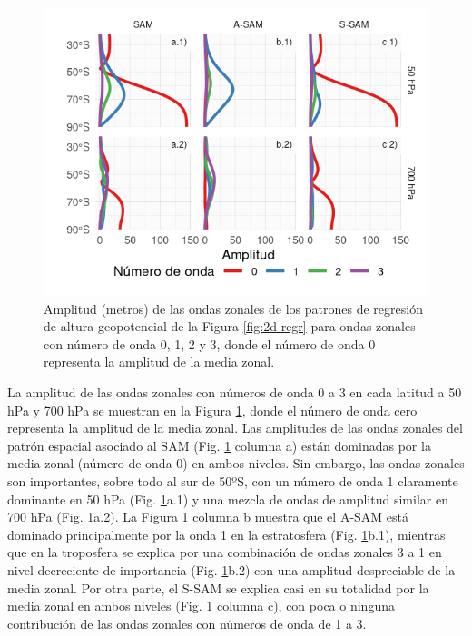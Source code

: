 \documentclass[12pt,oneside,a4paper]{reedthesis}
\begin{document}
\begin{figure}

{\centering \includegraphics{figures/30-sam/wave-amplitude-1} 

}

\caption{Amplitud (metros) de las ondas zonales de los patrones de regresión de altura geopotencial de la Figura \ref{fig:2d-regr} para ondas zonales con número de onda 0, 1, 2 y 3, donde el número de onda 0 representa la amplitud de la media zonal.}\label{fig:wave-amplitude}
\end{figure}

La amplitud de las ondas zonales con números de onda 0 a 3 en cada latitud a 50 hPa y 700 hPa se muestran en la Figura \ref{fig:wave-amplitude}, donde el número de onda cero representa la amplitud de la media zonal.
Las amplitudes de las ondas zonales del patrón espacial asociado al SAM (Fig. \ref{fig:wave-amplitude} columna a) están dominadas por la media zonal (número de onda 0) en ambos niveles.
Sin embargo, las ondas zonales son importantes, sobre todo al sur de 50ºS, con un número de onda 1 claramente dominante en 50 hPa (Fig. \ref{fig:wave-amplitude}a.1) y una mezcla de ondas de amplitud similar en 700 hPa (Fig. \ref{fig:wave-amplitude}a.2).
La Figura \ref{fig:wave-amplitude} columna b muestra que el A-SAM está dominado principalmente por la onda 1 en la estratosfera (Fig. \ref{fig:wave-amplitude}b.1), mientras que en la troposfera se explica por una combinación de ondas zonales 3 a 1 en nivel decreciente de importancia (Fig. \ref{fig:wave-amplitude}b.2) con una amplitud despreciable de la media zonal.
Por otra parte, el S-SAM se explica casi en su totalidad por la media zonal en ambos niveles (Fig. \ref{fig:wave-amplitude} columna c), con poca o ninguna contribución de las ondas zonales con números de onda de 1 a 3.
\end{document}
